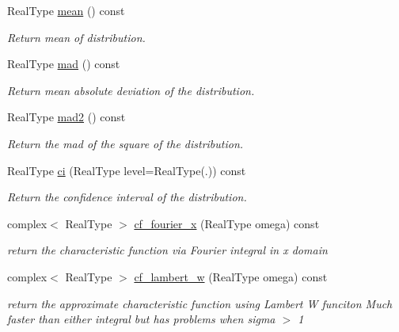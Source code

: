 \begin{DoxyCompactItemize}
Real\+Type \mbox{\hyperlink{structlognormal__distribution_a59152655fdac026bc8a8eb8abadc247f}{mean}} () const
\begin{DoxyCompactList}\small\item\em Return mean of distribution. \end{DoxyCompactList}\item 
\mbox{\label{structlognormal__distribution_ac7b2143d799524dd1c4e2661225ff6c7}} 
Real\+Type \mbox{\hyperlink{structlognormal__distribution_ac7b2143d799524dd1c4e2661225ff6c7}{mad}} () const
\begin{DoxyCompactList}\small\item\em Return mean absolute deviation of the distribution. \end{DoxyCompactList}\item 
Real\+Type \mbox{\hyperlink{structlognormal__distribution_a41c93e0aac16e184161abc486a61319a}{mad2}} () const
\begin{DoxyCompactList}\small\item\em Return the mad of the square of the distribution. \end{DoxyCompactList}\item 
\mbox{\label{structlognormal__distribution_ab2ecb3bc59203c7ea4acfe8a1d3ab332}} 
Real\+Type \mbox{\hyperlink{structlognormal__distribution_ab2ecb3bc59203c7ea4acfe8a1d3ab332}{ci}} (Real\+Type level=Real\+Type(.)) const
\begin{DoxyCompactList}\small\item\em Return the confidence interval of the distribution. \end{DoxyCompactList}\item 
complex$<$ Real\+Type $>$ \mbox{\hyperlink{structlognormal__distribution_adace4ecb55c85b772702ec91a9f5b559}{cf\+\_\+fourier\+\_\+x}} (Real\+Type omega) const
\begin{DoxyCompactList}\small\item\em return the characteristic function via Fourier integral in x domain \end{DoxyCompactList}\item 
complex$<$ Real\+Type $>$ \mbox{\hyperlink{structlognormal__distribution_ab0cead5567675a0ff6e3a3a5de1a1967}{cf\+\_\+lambert\+\_\+w}} (Real\+Type omega) const
\begin{DoxyCompactList}\small\item\em return the approximate characteristic function using Lambert W funciton Much faster than either integral but has problems when sigma $>$ 1 \end{DoxyCompactList}\item 

\end{DoxyCompactItemize}
